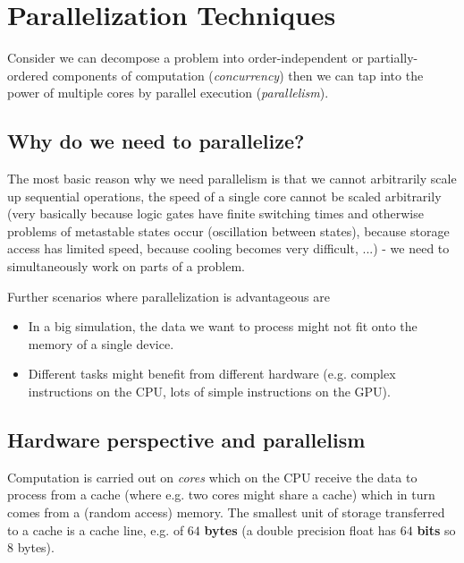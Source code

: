 \section{Parallelization Techniques}
\thispagestyle{plain}

Consider we can decompose a problem
into order-independent or partially-ordered
components of computation (\textit{concurrency})
then we can tap into the power of multiple
cores by parallel execution (\textit{parallelism}).

\subsection{Why do we need to parallelize?}
The most basic reason why we need parallelism is that we cannot arbitrarily
scale up sequential operations, the speed of a single core cannot be scaled
arbitrarily (very basically because logic gates have finite switching times
and otherwise problems of metastable states occur (oscillation
between states), because storage access has limited speed, because cooling becomes very difficult, ...) - 
\textcolor{green1}{we need to simultaneously work on parts of a problem}.


Further scenarios where parallelization is advantageous are

\begin{itemize}
    \item In a big simulation, the data we want to process might not fit onto the memory
    of a single device.
    \item Different tasks might benefit from different hardware (e.g. complex instructions
    on the CPU, lots of simple instructions on the GPU).
\end{itemize}

\subsection{Hardware perspective and parallelism}
Computation is carried out on \textit{cores} which on the CPU receive the
data to process from a cache (where e.g. two cores might share a cache) which
in turn comes from a (random access) memory. The smallest unit of storage
transferred to a cache is a cache line, e.g. of $64$ \textbf{bytes} (a double
precision float has $64$ \textbf{bits} so $8$ bytes).

